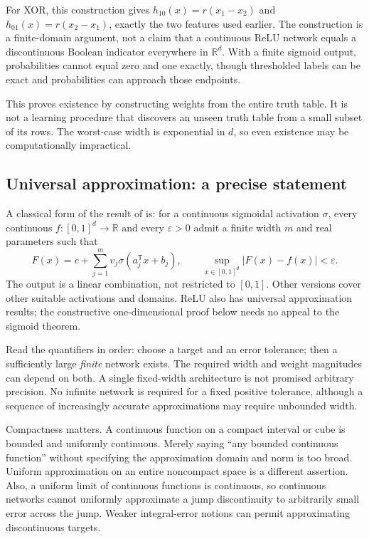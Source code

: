 For XOR, this construction gives $h_{10}(x)=r(x_1-x_2)$ and $h_{01}(x)=r(x_2-x_1)$, exactly the two features used earlier. The construction is a finite-domain argument, not a claim that a continuous ReLU network equals a discontinuous Boolean indicator everywhere in $\mathbb{R}^d$. With a finite sigmoid output, probabilities cannot equal zero and one exactly, though thresholded labels can be exact and probabilities can approach those endpoints.

This proves existence by constructing weights from the entire truth table. It is not a learning procedure that discovers an unseen truth table from a small subset of its rows. The worst-case width is exponential in $d$, so even existence may be computationally impractical.

\subsection{Universal approximation: a precise statement}
A classical form of the result of \citet{cybenko1989} is: for a continuous sigmoidal activation $\sigma$, every continuous $f:[0,1]^d\to\mathbb{R}$ and every $\varepsilon>0$ admit a finite width $m$ and real parameters such that
\begin{equation}
 F(x)=c+\sum_{j=1}^m v_j\sigma(a_j^{\mathsf T}x+b_j),\qquad
 \sup_{x\in[0,1]^d}|F(x)-f(x)|<\varepsilon.
\end{equation}
The output is a linear combination, not restricted to $[0,1]$. Other versions cover other suitable activations and domains. ReLU also has universal approximation results; the constructive one-dimensional proof below needs no appeal to the sigmoid theorem.

Read the quantifiers in order: choose a target and an error tolerance; then a sufficiently large \emph{finite} network exists. The required width and weight magnitudes can depend on both. A single fixed-width architecture is not promised arbitrary precision. No infinite network is required for a fixed positive tolerance, although a sequence of increasingly accurate approximations may require unbounded width.

Compactness matters. A continuous function on a compact interval or cube is bounded and uniformly continuous. Merely saying ``any bounded continuous function'' without specifying the approximation domain and norm is too broad. Uniform approximation on an entire noncompact space is a different assertion. Also, a uniform limit of continuous functions is continuous, so continuous networks cannot uniformly approximate a jump discontinuity to arbitrarily small error across the jump. Weaker integral-error notions can permit approximating discontinuous targets.

